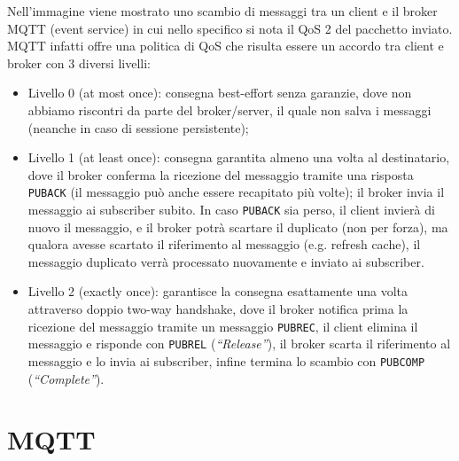 Nell'immagine viene mostrato uno scambio di messaggi tra un client e il broker MQTT (event service) in cui nello specifico si nota il QoS 2 del pacchetto inviato. MQTT infatti offre una politica di QoS che risulta essere un accordo tra client e broker con 3 diversi livelli:

\begin{itemize}
\item Livello 0 (at most once): consegna best-effort senza garanzie, dove non abbiamo riscontri da parte del broker/server, il quale non salva i messaggi (neanche in caso di sessione persistente);
\item Livello 1 (at least once): consegna garantita almeno una volta al destinatario, dove il broker conferma la ricezione del messaggio tramite una risposta \texttt{PUBACK} (il messaggio può anche essere recapitato più volte);
il broker invia il messaggio ai subscriber subito. In caso \texttt{PUBACK} sia perso, il client invierà di nuovo il messaggio, e il broker potrà scartare il duplicato (non per forza), ma qualora avesse scartato il riferimento al messaggio (e.g. refresh cache), il messaggio duplicato verrà processato nuovamente e inviato ai subscriber.

\item Livello 2 (exactly once): garantisce la consegna esattamente una volta attraverso doppio two-way handshake, dove il broker notifica prima la ricezione del messaggio tramite un messaggio \texttt{PUBREC}, il client elimina il messaggio e risponde con \texttt{PUBREL} (\textit{``Release''}), il broker scarta il riferimento al messaggio e lo invia ai subscriber, infine termina lo scambio con \texttt{PUBCOMP} (\textit{``Complete''}).
\end{itemize}

\section{MQTT}


